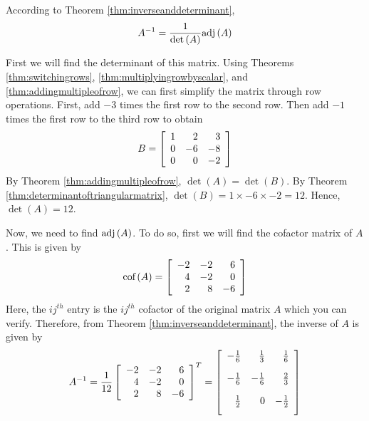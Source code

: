 \begin{solution} 
According to Theorem \ref{thm:inverseanddeterminant}, 
\begin{equation*}
A^{-1} = \frac{1}{\det \left(A\right)} \mbox{adj}\left(A\right)
\end{equation*}

First we will find the determinant of this matrix. Using Theorems \ref{thm:switchingrows}, \ref{thm:multiplyingrowbyscalar},
and \ref{thm:addingmultipleofrow}, we can first simplify the matrix through row operations. First, add $-3$ times the first row to the second row. Then
add $-1$ times the first row to the third row to obtain
\begin{equation*}
B = \left[
\begin{array}{rrr}
1 & 2 & 3 \\
0 & -6 & -8 \\
0 & 0 & -2
\end{array}
\right]
\end{equation*}
By Theorem \ref{thm:addingmultipleofrow}, $\det \left(A\right) = \det \left(B\right)$. By Theorem \ref{thm:determinantoftriangularmatrix}, 
$\det \left(B\right) = 1 \times -6 \times -2 = 12$. Hence, $\det \left(A\right) = 12$. 

Now, we need to find $\mbox{adj} \left(A\right)$. To do so, first we will find the cofactor matrix of $A$. 
This is given by
\begin{equation*}
\mbox{cof}\left( A\right) 
=
\left[
\begin{array}{rrr}
-2 & -2 & 6 \\
4 & -2 & 0 \\
2 & 8 & -6
\end{array}
\right] 
\end{equation*}
Here, the $ij^{th}$ entry is the $ij^{th}$ cofactor of the original matrix $A$ which you can verify. Therefore, from Theorem \ref{thm:inverseanddeterminant},
 the inverse of $A$ is given by 
\begin{equation*}
A^{-1}
=
\vspace{0.05in}\frac{1}{12}\leftB
\begin{array}{rrr}
-2 & -2 & 6 \\
4 & -2 & 0 \\
2 & 8 & -6
\end{array}
\rightB ^{T}=\allowbreak \leftB
\begin{array}{rrr}
-\vspace{0.05in}\frac{1}{6} & \vspace{0.05in}\frac{1}{3} & \vspace{0.05in}
\frac{1}{6} \\
-\vspace{0.05in}\frac{1}{6} & -\vspace{0.05in}\frac{1}{6} & \vspace{0.05in}
\frac{2}{3} \\
\vspace{0.05in}\frac{1}{2} & 0 & -\vspace{0.05in}\frac{1}{2}
\end{array}
\rightB 
\end{equation*}


\end{solution}
